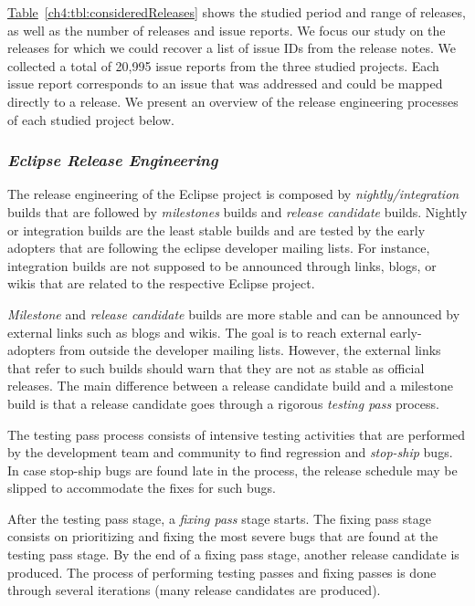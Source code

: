 \hyperref[ch4:tbl:consideredReleases]{Table}~\ref{ch4:tbl:consideredReleases} shows the
studied period and range of releases, as well as the number of releases and
issue reports. We focus our study on the releases for which we could recover a
list of issue IDs from the release notes. We collected a total of 20,995 issue
reports from the three studied projects. Each issue report corresponds to an
issue that was addressed and could be mapped directly to a release. We present
an overview of the release engineering processes of each studied project below.

\subsubsection*{\textbf{\textit{Eclipse Release Engineering}}}\label{eclipse:releng}

The release engineering of the Eclipse project is composed by {\em
nightly/integration} builds that are followed by {\em milestones} builds and
{\em release candidate} builds. Nightly or integration builds are the least
stable builds and are tested by the early adopters that are following the
eclipse developer mailing lists. For instance, integration builds are not
supposed to be announced through links, blogs, or wikis that are related to the
respective Eclipse
project. 

{\em Milestone} and {\em release candidate} builds are more stable and can be
announced by external links such as blogs and wikis. The goal is to reach
external early-adopters from outside the developer mailing lists. However, the
external links that refer to such builds should warn that they are not as stable
as official releases. The main difference between a release candidate build and
a milestone build is that a release candidate goes through a rigorous {\em
testing pass}
process.

The testing pass process consists of intensive testing activities that are
performed by the development team and community to find regression and {\em
stop-ship} bugs. In case stop-ship bugs are found late in the process, the
release schedule may be slipped to accommodate the fixes for such
bugs.\footnotemark[15]

After the testing pass stage, a {\em fixing pass} stage starts. The fixing pass stage
consists on prioritizing and fixing the most severe bugs that are found at the
testing pass stage. By the end of a fixing pass stage, another release candidate is
produced. The process of performing testing passes and fixing passes is done through
several iterations (\ie many release candidates are produced). 

